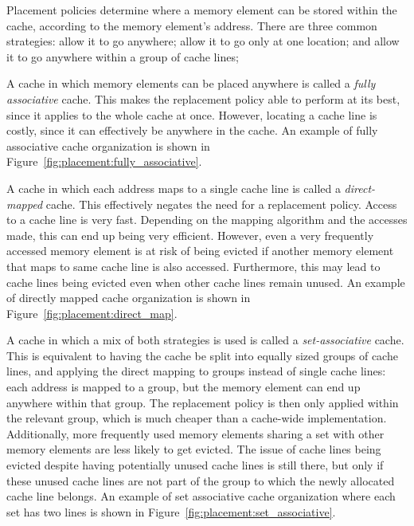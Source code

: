Placement policies determine where a memory element can be stored within the
cache, according to the memory element's address. There are three common
strategies: allow it to go anywhere; allow it to go only at one location; and
allow it to go anywhere within a group of cache lines;

A cache in which memory elements can be placed anywhere is called a
\textit{fully associative} cache. This makes the replacement policy able to
perform at its best, since it applies to the whole cache at once. However,
locating a cache line is costly, since it can effectively be anywhere in the
cache. An example of fully associative cache organization is shown in
Figure~\ref{fig:placement:fully_associative}.

A cache in which each address maps to a single cache line is called a
\textit{direct-mapped} cache. This effectively negates the need for a
replacement policy. Access to a cache line is very fast. Depending on
the mapping algorithm and the accesses made, this can end up being very
efficient. However, even a very frequently accessed memory element is at risk of
being evicted if another memory element that maps to same cache line is also
accessed. Furthermore, this may lead to cache lines being evicted even when
other cache lines remain unused. An example of directly mapped cache
organization is shown in Figure~\ref{fig:placement:direct_map}.

A cache in which a mix of both strategies is used is called a
\textit{set-associative} cache. This is equivalent to having the cache be split
into equally sized groups of cache lines, and applying the direct mapping to
groups instead of single cache lines: each address is mapped to a group, but the
memory element can end up anywhere within that group. The replacement policy is
then only applied within the relevant group, which is much cheaper than a
cache-wide implementation. Additionally, more frequently used memory elements
sharing a set with other memory elements are less likely to get evicted. The
issue of cache lines being evicted despite having potentially unused cache lines
is still there, but only if these unused cache lines are not part of the group
to which the newly allocated cache line belongs. An example of set associative
cache organization where each set has two lines is shown in
Figure~\ref{fig:placement:set_associative}.
